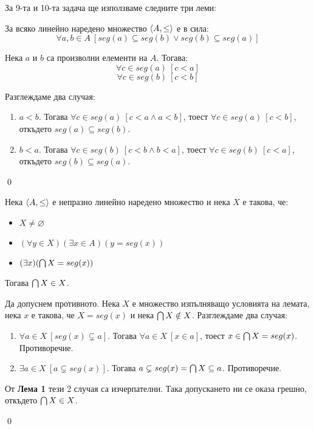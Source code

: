 \quad
За 9-та и 10-та задача ще използваме следните три леми:

\begin{tcolorbox}[mybox={Лема 1}, colback=purple!20, colframe=purple!40]
\quad
За всяко линейно наредено множество $\langle A, \leq \rangle$ е в сила:
\[
\forall a, b \in A\ [ seg(a) \subseteq seg(b) \lor seg(b) \subseteq seg(a)]
\]
\end{tcolorbox}

\begin{tcolorbox}[mybox={Доказателство:}]
\quad
Нека $a$ и $b$ са произволни елементи на $A$.
Тогава:
\[
\forall c \in seg(a) \ [c < a]
\]
\[
\forall c \in seg(b) \ [c < b]
\]

\quad
Разглеждаме два случая:
\begin{enumerate}[label={\arabic* сл.}]
\item
$a<b$.
Тогава $\forall c \in seg(a) \ [c<a \land a<b]$, тоест $\forall c \in seg(a) \ [c<b]$, откъдето $seg(a) \subseteq seg(b)$.

\item
$b<a$.
Тогава $\forall c \in seg(b) \ [c<b \land b<a]$, тоест $\forall c \in seg(b) \ [c<a]$, откъдето $seg(b) \subseteq seg(a)$.

\end{enumerate}
\qed
\end{tcolorbox}

\begin{tcolorbox}[mybox={Лема 2}, colback=purple!20, colframe=purple!40]

\quad
Нека $\langle A, \leq \rangle$ е непразно линейно наредено множество и нека $X$ е такова, че:
\begin{itemize}
\item
$X \neq \varnothing$
\item
$(\forall y \in X)(\exists x \in A)(y = seg(x))$
\item
$(\exists x)(\bigcap X = seg(x))$
\end{itemize}

\quad
Тогава $\bigcap X \in X$.
\end{tcolorbox}

\begin{tcolorbox}[mybox={Доказателство:}]
\quad
Да допуснем противното.
Нека $X$ е множество изпълняващо условията на лемата, нека $x$ е такова, че $X = seg(x)$ и нека $\bigcap X \notin X$.
Разглеждаме два случая:
\begin{enumerate}[label={\arabic* сл.}]
\item
$\forall a \in X\ [seg(x) \subsetneq a]$.
Тогава $\forall a \in X\ [x \in a]$, тоест $x \in \bigcap X = seg(x)$. Противоречие.
\item
$\exists a \in X\ [a \subsetneq seg(x) ]$.
Тогава $a \subsetneq seg(x) = \bigcap X \subseteq a$. Противоречие.
\end{enumerate}

\quad
От \textbf{Лема 1} тези 2 случая са изчерпателни.
Така допускането ни се оказа грешно, откъдето $\bigcap X \in X$.

\qed


\end{tcolorbox}


